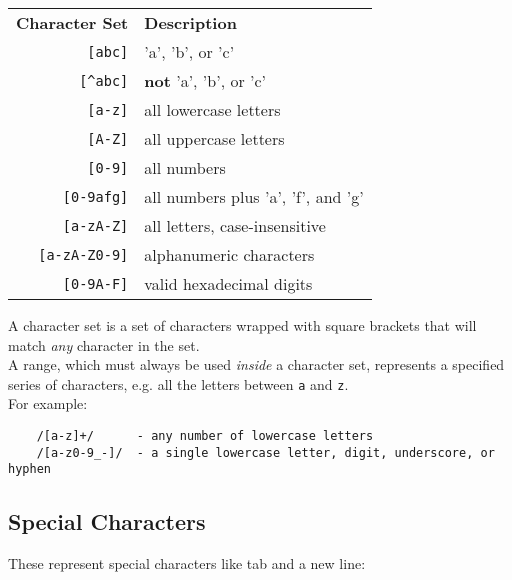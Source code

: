 \begin{center}
    \begin{small}
        \begin{tabularx}{\textwidth}{r l}
            \textbf{Character Set}          & \textbf{Description} \\
            \texttt{[abc]}          & 'a', 'b', or 'c' \\
            \texttt{[\textasciicircum abc]}         & \textbf{not} 'a', 'b', or 'c' \\
            \texttt{[a-z]}          & all lowercase letters \\
            \texttt{[A-Z]}          & all uppercase letters \\
            \texttt{[0-9]}          & all numbers \\
            \texttt{[0-9afg]}       & all numbers plus 'a', 'f', and 'g' \\
            \texttt{[a-zA-Z]}       & all letters, case-insensitive \\
            \texttt{[a-zA-Z0-9]}    & alphanumeric characters \\
            \texttt{[0-9A-F]}       & valid hexadecimal digits \\
        \end{tabularx}
    \end{small}
\end{center}

A character set is a set of characters wrapped with square brackets that will match \textit{any} character in the set.
\\

A range, which must always be used \textit{inside} a character set, represents a specified series of characters, e.g. all the letters between \texttt{a} and \texttt{z}.
\\

For example:

\begin{verbatim}
    /[a-z]+/      - any number of lowercase letters
    /[a-z0-9_-]/  - a single lowercase letter, digit, underscore, or hyphen
\end{verbatim}

\subsection{Special Characters}

These represent special characters like tab and a new line:

